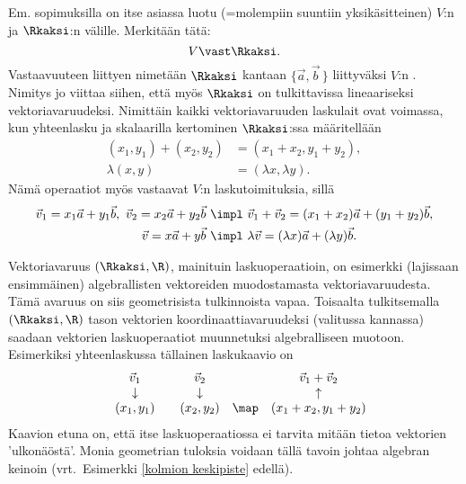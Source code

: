Em. sopimuksilla on itse asiassa luotu  (=molempiin suuntiin 
yksikäsitteinen)
%
 $V$:n ja $\Rkaksi$:n välille. Merkitään tätä: 
\[
V \vast \Rkaksi.
\]
Vastaavuuteen liittyen nimetään $\Rkaksi$ kantaan $\{\vec a, \vec b\,\}$ liittyväksi $V$:n
% 
. Nimitys jo viittaa siihen, että myös $\Rkaksi$ on tulkittavissa
%
lineaariseksi vektoriavaruudeksi. Nimittäin kaikki vektoriavaruuden laskulait ovat voimassa,
kun yhteenlasku ja skalaarilla kertominen $\Rkaksi$:ssa määritellään
\begin{align*}
(x_1,y_1)+(x_2,y_2)& = (x_1+x_2,y_1+y_2), \\
\lambda(x,y) &= (\lambda x, \lambda y).
\end{align*}
Nämä operaatiot myös vastaavat $V$:n laskutoimituksia, sillä
\begin{align*}
\vec v_1=x_1 \vec a + y_1 \vec b, \ \vec v_2= x_2 \vec a + y_2 \vec b \ 
                               &\impl \ \vec v_1 + \vec v_2 = (x_1+x_2)\vec a 
                                                                        + (y_1+y_2)\vec b, \\
\vec v = x \vec a +y \vec b \  &\impl \ \lambda \vec v = (\lambda x)\vec a +(\lambda y)\vec b.
\end{align*}

Vektoriavaruus $(\Rkaksi,\R)$, mainituin laskuoperaatioin, on esimerkki (lajissaan ensimmäinen)
algebrallisten vektoreiden muodostamasta vektoriavaruudesta. Tämä avaruus on
siis geometrisista tulkinnoista vapaa. Toisaalta tulkitsemalla $(\Rkaksi,\R)$ tason vektorien
koordinaattiavaruudeksi (valitussa kannassa) saadaan vektorien laskuoperaatiot muunnetuksi 
algebralliseen muotoon. Esimerkiksi yhteenlaskussa tällainen laskukaavio on
\[
\begin{array}{cccccc}
&\vec v_1   &  &\vec v_2   &     &\vec v_1+\vec v_2 \\
&\downarrow &  &\downarrow &     &\uparrow \\ 
&(x_1,y_1)  &  &(x_2,y_2)  &\map &(x_1+x_2,y_1+y_2)
\end{array}
\]
Kaavion etuna on, että itse laskuoperaatiossa ei tarvita mitään tietoa vektorien 'ulkonäöstä'.
Monia geometrian tuloksia voidaan tällä tavoin johtaa algebran keinoin (vrt.\ Esimerkki 
\ref{kolmion keskipiste} edellä).

